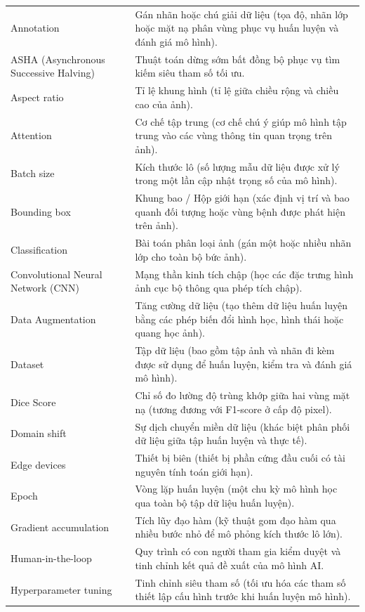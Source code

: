 \begin{longtable}{p{5.2cm} p{10.8cm}}
    Annotation & Gán nhãn hoặc chú giải dữ liệu (tọa độ, nhãn lớp hoặc mặt nạ phân vùng phục vụ huấn luyện và đánh giá mô hình). \\
    ASHA (Asynchronous Successive Halving) & Thuật toán dừng sớm bất đồng bộ phục vụ tìm kiếm siêu tham số tối ưu. \\
    Aspect ratio & Tỉ lệ khung hình (tỉ lệ giữa chiều rộng và chiều cao của ảnh). \\
    Attention & Cơ chế tập trung (cơ chế chú ý giúp mô hình tập trung vào các vùng thông tin quan trọng trên ảnh). \\
    Batch size & Kích thước lô (số lượng mẫu dữ liệu được xử lý trong một lần cập nhật trọng số của mô hình). \\
    Bounding box & Khung bao / Hộp giới hạn (xác định vị trí và bao quanh đối tượng hoặc vùng bệnh được phát hiện trên ảnh). \\
    Classification & Bài toán phân loại ảnh (gán một hoặc nhiều nhãn lớp cho toàn bộ bức ảnh). \\
    Convolutional Neural Network (CNN) & Mạng thần kinh tích chập (học các đặc trưng hình ảnh cục bộ thông qua phép tích chập). \\
    Data Augmentation & Tăng cường dữ liệu (tạo thêm dữ liệu huấn luyện bằng các phép biến đổi hình học, hình thái hoặc quang học ảnh). \\
    Dataset & Tập dữ liệu (bao gồm tập ảnh và nhãn đi kèm được sử dụng để huấn luyện, kiểm tra và đánh giá mô hình). \\
    Dice Score & Chỉ số đo lường độ trùng khớp giữa hai vùng mặt nạ (tương đương với F1-score ở cấp độ pixel). \\
    Domain shift & Sự dịch chuyển miền dữ liệu (khác biệt phân phối dữ liệu giữa tập huấn luyện và thực tế). \\
    Edge devices & Thiết bị biên (thiết bị phần cứng đầu cuối có tài nguyên tính toán giới hạn). \\
    Epoch & Vòng lặp huấn luyện (một chu kỳ mô hình học qua toàn bộ tập dữ liệu huấn luyện). \\
    Gradient accumulation & Tích lũy đạo hàm (kỹ thuật gom đạo hàm qua nhiều bước nhỏ để mô phỏng kích thước lô lớn). \\
    Human-in-the-loop & Quy trình có con người tham gia kiểm duyệt và tinh chỉnh kết quả đề xuất của mô hình AI. \\
    Hyperparameter tuning & Tinh chỉnh siêu tham số (tối ưu hóa các tham số thiết lập cấu hình trước khi huấn luyện mô hình). \\

\end{longtable}
